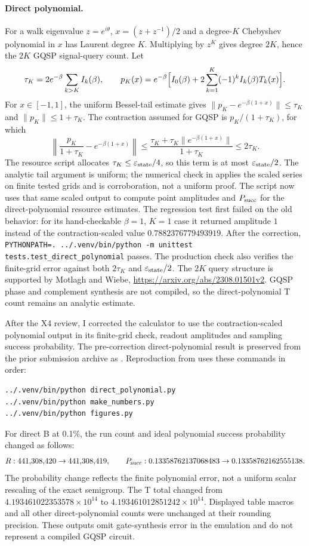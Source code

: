 \documentclass[11pt,a4paper]{article}
\begin{document}
\paragraph{Direct polynomial.}
For a walk eigenvalue $z=e^{i\theta}$, $x=(z+z^{-1})/2$ and a degree-$K$ Chebyshev polynomial in $x$ has Laurent degree $K$.
Multiplying by $z^K$ gives degree $2K$, hence the $2K$ GQSP signal-query count. Let
\[
 \tau_K=2e^{-\beta}\sum_{k>K}I_k(\beta),\qquad
 p_K(x)=e^{-\beta}\Bigl[I_0(\beta)+2\sum_{k=1}^{K}(-1)^kI_k(\beta)T_k(x)\Bigr].
\]
For $x\in[-1,1]$, the uniform Bessel-tail estimate gives
$\|p_K-e^{-\beta(1+x)}\|\le\tau_K$ and $\|p_K\|\le1+\tau_K$. The contraction assumed for GQSP is
$p_K/(1+\tau_K)$, for which
\[
 \left\|\frac{p_K}{1+\tau_K}-e^{-\beta(1+x)}\right\|
 \le\frac{\tau_K+\tau_K\|e^{-\beta(1+x)}\|}{1+\tau_K}\le2\tau_K.
\]
The resource script allocates $\tau_K\le\varepsilon_{\rm state}/4$, so this term is at most
$\varepsilon_{\rm state}/2$. The analytic tail argument is uniform; the numerical check in
 applies the scaled series on finite tested grids and is corroboration, not a uniform proof.
The script now uses that same scaled output to compute point amplitudes and $P_{\rm succ}$ for the direct-polynomial resource estimates.
The regression test  first failed on the old behavior: for its hand-checkable
$\beta=1$, $K=1$ case it returned amplitude $1$ instead of the contraction-scaled value $0.7882376779493919$. After the correction,
\texttt{PYTHONPATH=. ../.venv/bin/python -m unittest tests.test\_direct\_polynomial} passes. The production check also verifies the
finite-grid error against both $2\tau_K$ and $\varepsilon_{\rm state}/2$.
The $2K$ query structure is supported by Motlagh and Wiebe, \url{https://arxiv.org/abs/2308.01501v2}.
GQSP phase and complement synthesis are not compiled, so the direct-polynomial T count remains an analytic estimate.

After the X4 review, I corrected the calculator to use the contraction-scaled polynomial output in its finite-grid check,
readout amplitudes and sampling success probability. The pre-correction direct-polynomial result is preserved from the prior
submission archive as . Reproduction from  uses these commands in order:
\begin{verbatim}
../.venv/bin/python direct_polynomial.py
../.venv/bin/python make_numbers.py
../.venv/bin/python figures.py
\end{verbatim}
For direct B at 0.1\%, the run count and ideal polynomial success probability changed as follows:
\[
 R:441{,}308{,}420\to441{,}308{,}419,\qquad
 P_{\rm succ}:0.13358762137068483\to0.13358762162555138.
\]
The probability change reflects the finite polynomial error, not a uniform scalar rescaling of the exact semigroup. The T total
changed from $4.193461022353578\times10^{14}$ to $4.193461012851242\times10^{14}$. Displayed table macros and all other
direct-polynomial counts were unchanged at their rounding precision. These outputs omit gate-synthesis error in the emulation
and do not represent a compiled GQSP circuit.
\end{document}
